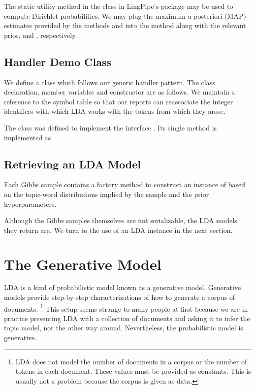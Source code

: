 The static utility method 
in the class  in LingPipe's  package may
be used to compute Dirichlet probabilities.  We may plug the maximum a
posteriori (MAP) estimates provided by the methods
 and  into the
 method along with the relevant prior,
 and , respectively.


\subsection{Handler Demo Class}

We define a class  which follows our
generic handler pattern.  The class declaration, member variables and
constructor are as follows.
%
%
We maintain a reference to the symbol table so that our reports
can reassociate the integer identifiers with which LDA works
with the tokens from which they arose.

The class was defined to implement the interface
.  Its single method is implemented
as


\subsection{Retrieving an LDA Model}

Each Gibbs sample contains a factory method  to construct
an instance of  based on the
topic-word distributions implied by the sample and the prior
hyperparameters.  

Although the Gibbs samples themselves are not serializable, the LDA
models they return are.  We turn to the use of an LDA instance in the
next section.


\section{The Generative Model}

LDA is a kind of probabilistic model known as a generative model.
Generative models provide step-by-step characterizations of how to
generate a corpus of documents.%
%
\footnote{LDA does not model the number of documents in a corpus
or the number of tokens in each document.  These values must be
provided as constants.  This is usually not a problem because
the corpus is given as data.}
%
This setup seems strange to many people at first because we are in
practice presenting LDA with a collection of documents and asking it
to infer the topic model, not the other way around.  Nevertheless, the
probabilistic model is generative.


